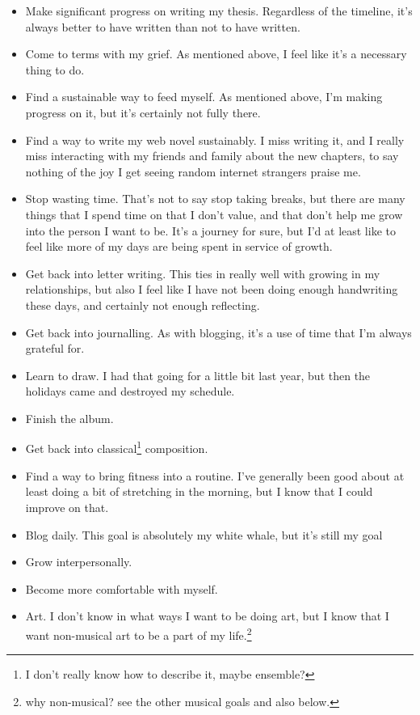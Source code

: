 \documentclass[12pt]{article}[titlepage]
\renewcommand{\,}{\textsuperscript{,}}
\begin{document}
\begin{itemize}  
\item Make significant progress on writing my thesis. Regardless of the timeline, it's always better to have written than not to have written.  
\item Come to terms with my grief. As mentioned above, I feel like it's a necessary thing to do.  
\item Find a sustainable way to feed myself. As mentioned above, I'm making progress on it, but it's certainly not fully there.  
\item Find a way to write my web novel sustainably. I miss writing it, and I really miss interacting with my friends and family about the new chapters, to say nothing of the joy I get seeing random internet strangers praise me.  
\item Stop wasting time. That's not to say stop taking breaks, but there are many things that I spend time on that I don't value, and that don't help me grow into the person I want to be. It's a journey for sure, but I'd at least like to feel like more of my days are being spent in service of growth.  
\item Get back into letter writing. This ties in really well with growing in my relationships, but also I feel like I have not been doing enough handwriting these days, and certainly not enough reflecting.  
\item Get back into journalling. As with blogging, it's a use of time that I'm always grateful for.  
\item Learn to draw. I had that going for a little bit last year, but then the holidays came and destroyed my schedule.  
\item Finish the album.  
\item Get back into classical\footnote{I don't really know how to describe it, maybe ensemble?} composition.  
\item Find a way to bring fitness into a routine. I've generally been good about at least doing a bit of stretching in the morning, but I know that I could improve on that.  
\item Blog daily. This goal is absolutely my white whale, but it's still my goal  
\item Grow interpersonally.  
\item Become more comfortable with myself.  
\item Art. I don't know in what ways I want to be doing art, but I know that I want non-musical art to be a part of my life.\footnote{why non-musical? see the other musical goals and also below.}  

\end{itemize}
\end{document}
